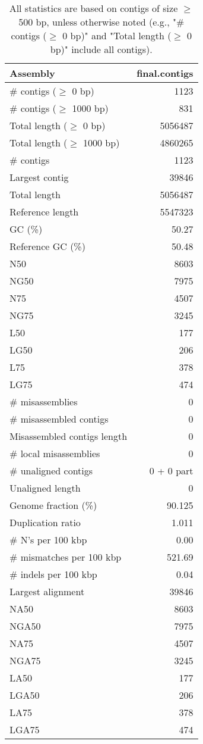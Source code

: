 \documentclass[12pt,a4paper]{article}
\begin{document}
\begin{table}[ht]
\begin{center}
\caption{All statistics are based on contigs of size $\geq$ 500 bp, unless otherwise noted (e.g., "\# contigs ($\geq$ 0 bp)" and "Total length ($\geq$ 0 bp)" include all contigs).}
\begin{tabular}{|l*{1}{|r}|}
\hline
Assembly & final.contigs \\ \hline
\# contigs ($\geq$ 0 bp) & 1123 \\ \hline
\# contigs ($\geq$ 1000 bp) & 831 \\ \hline
Total length ($\geq$ 0 bp) & 5056487 \\ \hline
Total length ($\geq$ 1000 bp) & 4860265 \\ \hline
\# contigs & 1123 \\ \hline
Largest contig & 39846 \\ \hline
Total length & 5056487 \\ \hline
Reference length & 5547323 \\ \hline
GC (\%) & 50.27 \\ \hline
Reference GC (\%) & 50.48 \\ \hline
N50 & 8603 \\ \hline
NG50 & 7975 \\ \hline
N75 & 4507 \\ \hline
NG75 & 3245 \\ \hline
L50 & 177 \\ \hline
LG50 & 206 \\ \hline
L75 & 378 \\ \hline
LG75 & 474 \\ \hline
\# misassemblies & 0 \\ \hline
\# misassembled contigs & 0 \\ \hline
Misassembled contigs length & 0 \\ \hline
\# local misassemblies & 0 \\ \hline
\# unaligned contigs & 0 + 0 part \\ \hline
Unaligned length & 0 \\ \hline
Genome fraction (\%) & 90.125 \\ \hline
Duplication ratio & 1.011 \\ \hline
\# N's per 100 kbp & 0.00 \\ \hline
\# mismatches per 100 kbp & 521.69 \\ \hline
\# indels per 100 kbp & 0.04 \\ \hline
Largest alignment & 39846 \\ \hline
NA50 & 8603 \\ \hline
NGA50 & 7975 \\ \hline
NA75 & 4507 \\ \hline
NGA75 & 3245 \\ \hline
LA50 & 177 \\ \hline
LGA50 & 206 \\ \hline
LA75 & 378 \\ \hline
LGA75 & 474 \\ \hline
\end{tabular}
\end{center}
\end{table}
\end{document}
